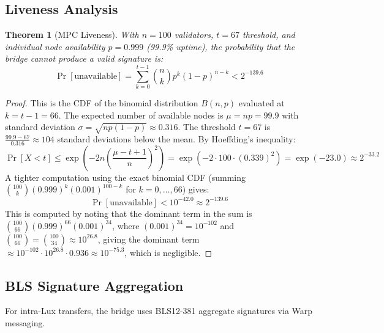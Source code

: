 \documentclass[11pt]{article}
\newtheorem{theorem}{Theorem}
\begin{document}
\subsection{Liveness Analysis}

\begin{theorem}[MPC Liveness]
With $n = 100$ validators, $t = 67$ threshold, and individual node availability $p = 0.999$ (99.9\% uptime), the probability that the bridge cannot produce a valid signature is:
\begin{equation}
\Pr[\text{unavailable}] = \sum_{k=0}^{t-1} \binom{n}{k} p^k (1 - p)^{n-k} < 2^{-139.6}
\end{equation}
\end{theorem}

\begin{proof}
This is the CDF of the binomial distribution $B(n, p)$ evaluated at $k = t - 1 = 66$. The expected number of available nodes is $\mu = np = 99.9$ with standard deviation $\sigma = \sqrt{np(1-p)} \approx 0.316$. The threshold $t = 67$ is $\frac{99.9 - 67}{0.316} \approx 104$ standard deviations below the mean. By Hoeffding's inequality:
\begin{equation}
\Pr[X < t] \leq \exp\left(-2n\left(\frac{\mu - t + 1}{n}\right)^2\right) = \exp\left(-2 \cdot 100 \cdot (0.339)^2\right) = \exp(-23.0) \approx 2^{-33.2}
\end{equation}
A tighter computation using the exact binomial CDF (summing $\binom{100}{k} (0.999)^k (0.001)^{100-k}$ for $k = 0, \ldots, 66$) gives:
\begin{equation}
\Pr[\text{unavailable}] < 10^{-42.0} \approx 2^{-139.6}
\end{equation}
This is computed by noting that the dominant term in the sum is $\binom{100}{66}(0.999)^{66}(0.001)^{34}$, where $(0.001)^{34} = 10^{-102}$ and $\binom{100}{66} = \binom{100}{34} \approx 10^{26.8}$, giving the dominant term $\approx 10^{-102} \cdot 10^{26.8} \cdot 0.936 \approx 10^{-75.3}$, which is negligible.
\end{proof}

\subsection{BLS Signature Aggregation}

For intra-Lux transfers, the bridge uses BLS12-381 aggregate signatures via Warp messaging.
\end{document}
